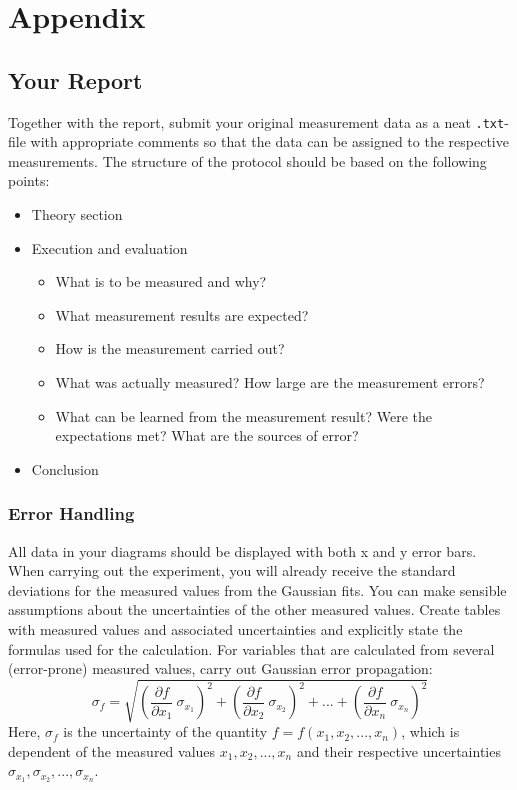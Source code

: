 \newpage
\appendix
%
\section{Appendix}\label{sec:appendix}
%
\subsection{Your Report}
Together with the report, submit your original measurement data as a neat \texttt{.txt}-file with appropriate comments so that the data can be assigned to the respective measurements. The structure of the protocol should be based on the following points:
\begin{itemize}
	\item Theory section
	\item Execution and evaluation
	\begin{itemize}
		\item What is to be measured and why?
		\item What measurement results are expected?
		\item How is the measurement carried out?
		\item What was actually measured? How large are the measurement errors?
		\item What can be learned from the measurement result? Were the expectations met?
		What are the sources of error?
	\end{itemize}
	\item Conclusion
\end{itemize}
%
\subsubsection*{Error Handling}
All data in your diagrams should be displayed with both x and y error bars.
When carrying out the experiment, you will already receive the standard deviations for the measured values from the Gaussian fits. 
You can make sensible assumptions about the uncertainties of the other measured values. 
Create tables with measured values and associated uncertainties and explicitly state the formulas used for the calculation.
For variables that are calculated from several (error-prone) measured values, carry out Gaussian error propagation:
\begin{equation}\label{eq:RSS}
	\sigma_{f} = \sqrt{\left( \frac{\partial f}{\partial x_1}\ \sigma_{x_1} \right)^2 + \left( \frac{\partial f}{\partial x_2}\ \sigma_{x_2} \right)^2 + ... + \left( \frac{\partial f}{\partial x_n}\ \sigma_{x_n} \right)^2} 
\end{equation}
Here, $\sigma_{f}$ is the uncertainty of the quantity $f = f (x_1, x_2, ... , x_n)$, which is dependent of the measured values $x_1, x_2, ... , x_n$ and their respective uncertainties $\sigma_{x_1}, \sigma_{x_2}, ..., \sigma_{x_n}$. 

